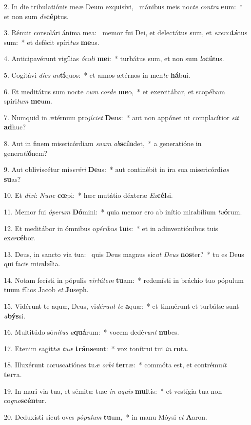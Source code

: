 2. In die tribulatiónis meæ Deum exquisívi, \dag\  mánibus meis noc\textit{te} \textit{con}\textit{tra} \textbf{e}um:~*  et non sum \textit{de}\textbf{cép}tus.\

3. Rénuit consolári ánima mea: \dag\  memor fui Dei, et delectátus sum, et \textit{ex}\textit{er}\textit{ci}\textbf{tá}tus sum:~*  et defécit spíri\textit{tus} \textbf{me}us.\

4. Anticipavérunt vigílias \textit{ó}\textit{cu}\textit{li} \textbf{me}i:~*  turbátus sum, et non sum \textit{lo}\textbf{cú}tus.\

5. Cogitávi \textit{di}\textit{es} \textit{an}\textbf{tí}quos:~*  et annos ætérnos in men\textit{te} \textbf{há}bui.\

6. Et meditátus sum nocte \textit{cum} \textit{cor}\textit{de} \textbf{me}o,~*  et exercitábar, et scopébam spíri\textit{tum} \textbf{me}um.\

7. Numquid in ætérnum pro\textit{jí}\textit{ci}\textit{et} \textbf{De}us:~*  aut non appónet ut complacítior \textit{sit} \textbf{ad}huc?\

8. Aut in finem misericórdiam \textit{su}\textit{am} \textit{ab}\textbf{scín}det,~*  a generatióne in genera\textit{ti}\textbf{ó}nem?\

9. Aut obliviscétur mi\textit{se}\textit{ré}\textit{ri} \textbf{De}us:~*  aut continébit in ira sua misericórdi\textit{as} \textbf{su}as?\

10. Et \textit{di}\textit{xi}: \textit{Nunc} \textbf{cœ}pi:~*  hæc mutátio déxteræ \textit{Ex}\textbf{cél}si.\

11. Memor fui \textit{ó}\textit{pe}\textit{rum} \textbf{Dó}mini:~*  quia memor ero ab inítio mirabílium \textit{tu}\textbf{ó}rum.\

12. Et meditábor in ómnibus o\textit{pé}\textit{ri}\textit{bus} \textbf{tu}is:~*  et in adinventiónibus tuis ex\textit{er}\textbf{cé}bor.\

13. Deus, in sancto via tua: \dag\  quis Deus magnus sic\textit{ut} \textit{De}\textit{us} \textbf{nos}ter?~*  tu es Deus qui facis mi\textit{ra}\textbf{bí}lia.\

14. Notam fecísti in pópulis \textit{vir}\textit{tú}\textit{tem} \textbf{tu}am:~*  redemísti in bráchio tuo pópulum tuum fílios Jacob \textit{et} \textbf{Jo}seph.\

15. Vidérunt te aquæ, Deus, vi\textit{dé}\textit{runt} \textit{te} \textbf{a}quæ:~*  et timuérunt et turbátæ sunt \textit{a}\textbf{býs}si.\

16. Multitúdo só\textit{ni}\textit{tus} \textit{a}\textbf{quá}rum:~*  vocem dedé\textit{runt} \textbf{nu}bes.\

17. Etenim sagít\textit{tæ} \textit{tu}\textit{æ} \textbf{tráns}eunt:~*  vox tonítrui tui \textit{in} \textbf{ro}ta.\

18. Illuxérunt coruscatiónes tu\textit{æ} \textit{or}\textit{bi} \textbf{ter}ræ:~*  commóta est, et contrému\textit{it} \textbf{ter}ra.\

19. In mari via tua, et sémitæ tuæ \textit{in} \textit{a}\textit{quis} \textbf{mul}tis:~*  et vestígia tua non co\textit{gno}\textbf{scén}tur.\

20. Deduxísti sicut oves \textit{pó}\textit{pu}\textit{lum} \textbf{tu}um,~*  in manu Móysi \textit{et} \textbf{A}aron.\

